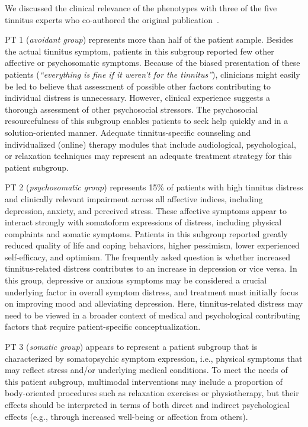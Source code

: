 \documentclass[
  oneside]{book}
\begin{document}
We discussed the clinical relevance of the phenotypes with three of the five tinnitus experts who co-authored the original publication~\autocite{Niemann:SREP_Pheno2020}.

PT 1 (\emph{avoidant group}) represents more than half of the patient sample.
Besides the actual tinnitus symptom, patients in this subgroup reported few other affective or psychosomatic symptoms.
Because of the biased presentation of these patients (\emph{``everything is fine if it weren't for the tinnitus''}), clinicians might easily be led to believe that assessment of possible other factors contributing to individual distress is unnecessary.
However, clinical experience suggests a thorough assessment of other psychosocial stressors.
The psychosocial resourcefulness of this subgroup enables patients to seek help quickly and in a solution-oriented manner.
Adequate tinnitus-specific counseling and individualized (online) therapy modules that include audiological, psychological, or relaxation techniques may represent an adequate treatment strategy for this patient subgroup.

PT 2 (\emph{psychosomatic group}) represents 15\% of patients with high tinnitus distress and clinically relevant impairment across all affective indices, including depression, anxiety, and perceived stress.
These affective symptoms appear to interact strongly with somatoform expressions of distress, including physical complaints and somatic symptoms.
Patients in this subgroup reported greatly reduced quality of life and coping behaviors, higher pessimism, lower experienced self-efficacy, and optimism.
The frequently asked question is whether increased tinnitus-related distress contributes to an increase in depression or vice versa.
In this group, depressive or anxious symptoms may be considered a crucial underlying factor in overall symptom distress, and treatment must initially focus on improving mood and alleviating depression.
Here, tinnitus-related distress may need to be viewed in a broader context of medical and psychological contributing factors that require patient-specific conceptualization.

PT 3 (\emph{somatic group}) appears to represent a patient subgroup that is
characterized by somatopsychic symptom expression, i.e., physical symptoms that may reflect stress and/or underlying medical conditions.
To meet the needs of this patient subgroup, multimodal interventions may include a proportion of body-oriented procedures such as relaxation exercises or physiotherapy, but their effects should be interpreted in terms of both direct and indirect psychological effects (e.g., through increased well-being or affection from others).
\end{document}
